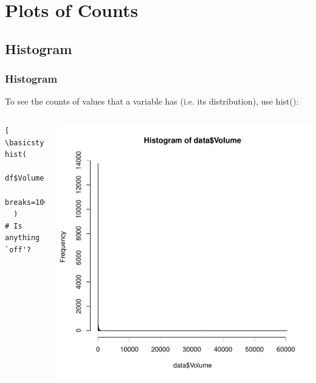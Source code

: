 \section{Plots of Counts}
\subsection{Histogram}

\begin{frame}
  \frametitle{Histogram}
To see the counts of values that a variable has (i.e. its distribution), use \ttfamily hist(): \normalfont

    \begin{columns}
  \begin{lstlisting}[ \basicstyle=\small]
hist(
  df$Volume, 
  breaks=1000
  )
# Is anything `off'?
  \end{lstlisting}

        \begin{flushleft}
           \includegraphics[scale=0.3]{images/histogram.pdf}
        \end{flushleft}  
\end{columns}


\end{frame}
